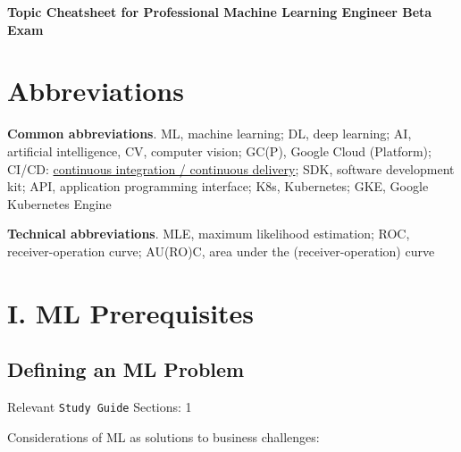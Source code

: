\documentclass[10pt,landscape,letterpaper]{cheatsheet}
\begin{document}
\begin{center}
  {\Large\sffamily\bfseries Topic Cheatsheet for Professional Machine Learning Engineer Beta Exam}  \\
\end{center}

\footnotesize
\setlength{\premulticols}{0pt}
\setlength{\postmulticols}{0pt}
\setlength{\multicolsep}{1pt}
\setlength{\columnsep}{1.8em}

\begin{multicols}{3}

\section{Abbreviations}

\textbf{Common abbreviations}. ML, machine learning; DL, deep learning; AI, artificial intelligence, CV, computer vision; GC(P), Google Cloud (Platform); CI/CD: \href{https://www.redhat.com/en/topics/devops/what-is-ci-cd}{continuous integration / continuous delivery}; SDK, software development kit; API, application programming interface; K8s, Kubernetes; GKE, Google Kubernetes Engine

\textbf{Technical abbreviations}. MLE, maximum likelihood estimation; ROC, receiver-operation curve; AU(RO)C, area under the (receiver-operation) curve

\section{I. ML Prerequisites}

\subsection{Defining an ML Problem}

Relevant \texttt{Study Guide} Sections: 1

Considerations of ML as solutions to business challenges:


\end{multicols}
\end{document}
